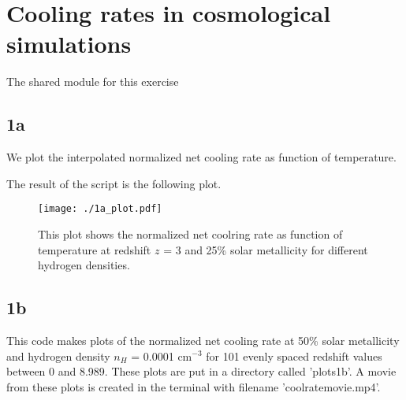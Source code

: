 \section{Cooling rates in cosmological simulations}

The shared module for this exercise 



\subsection{1a}

We plot the interpolated normalized net cooling rate as function of temperature.



The result of the script is the following plot.

\begin{figure}[h!]
  \centering
  \texttt{[image: ./1a\_plot.pdf]}
  \caption{This plot shows the normalized net coolring rate as function of temperature at redshift $z$ = 3 and 25\% solar metallicity for different hydrogen densities.}
  \label{fig:1a}
\end{figure}

\newpage

\subsection{1b}

This code makes plots of the normalized net cooling rate at 50\% solar metallicity and hydrogen density $n_{H}$ = 0.0001 $\mathrm{cm^{-3}}$ for 101 evenly spaced redshift values between 0 and 8.989. These plots are put in a directory called 'plots1b'. A movie from these plots is created in the terminal with filename 'coolratemovie.mp4'. 






